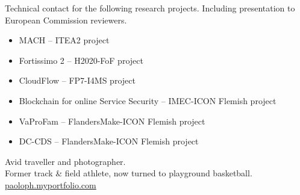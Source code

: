 \documentclass[10pt,a4paper]{altacv}
\begin{document}
Technical contact for the following research projects. Including presentation to European Commission reviewers.
\smallskip
\begin{itemize}
  \item MACH -- ITEA2 project
\item Fortissimo 2 -- H2020-FoF project
\item CloudFlow -- FP7-I4MS project
\item Blockchain for online Service Security -- IMEC-ICON Flemish project
\item VaProFam -- FlandersMake-ICON Flemish project
\item DC-CDS -- FlandersMake-ICON Flemish project
\end{itemize}

Avid traveller and photographer.\\
Former track \& field athlete, now turned to playground basketball.\\
\medskip
\faCamera \hspace{0.4pc} \url{paoloph.myportfolio.com}
\end{document}
